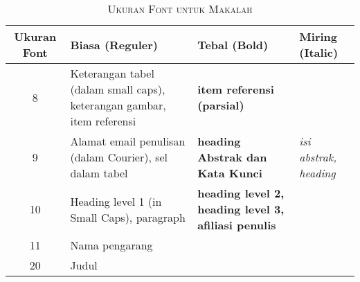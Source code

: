
\begin{table}[h]
\centering
\caption{{\eightp\textsc{Ukuran Font untuk Makalah}}}
\label{tab:font_sizes}
{\eightp
\begin{tabular}{|c|p{2.5cm}|p{1.8cm}|p{1.8cm}|}
\hline
\textbf{Ukuran Font} & \textbf{Biasa (Reguler)} & \textbf{Tebal (Bold)} & \textbf{Miring (Italic)} \\
\hline
8 & Keterangan tabel (dalam small caps), keterangan gambar, item referensi & \textbf{item referensi (parsial)} & \\
\hline
9 & Alamat email penulisan (dalam Courier), sel dalam tabel & \textbf{heading Abstrak dan Kata Kunci} & \textit{isi abstrak, heading} \\
\hline
10 & Heading level 1 (in Small Caps), paragraph & \textbf{heading level 2, heading level 3, afiliasi penulis} & \\
\hline
11 & Nama pengarang & & \\
\hline
20 & Judul & & \\
\hline
\end{tabular}
}
\end{table}
